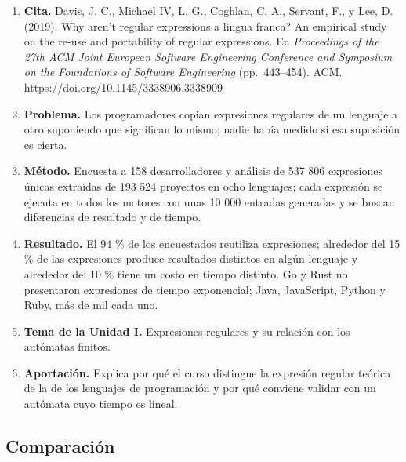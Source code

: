 \begin{enumerate}
\def\labelenumi{\arabic{enumi}.}
\tightlist
\item
  \textbf{Cita.} Davis, J. C., Michael IV, L. G., Coghlan, C. A., Servant, F., y Lee, D. (2019). Why aren't regular expressions a lingua franca? An empirical study on the re-use and portability of regular expressions. En \emph{Proceedings of the 27th ACM Joint European Software Engineering Conference and Symposium on the Foundations of Software Engineering} (pp.~443--454). ACM. \url{https://doi.org/10.1145/3338906.3338909}
\item
  \textbf{Problema.} Los programadores copian expresiones regulares de un lenguaje a otro suponiendo que significan lo mismo; nadie había medido si esa suposición es cierta.
\item
  \textbf{Método.} Encuesta a 158 desarrolladores y análisis de 537 806 expresiones únicas extraídas de 193 524 proyectos en ocho lenguajes; cada expresión se ejecuta en todos los motores con unas 10 000 entradas generadas y se buscan diferencias de resultado y de tiempo.
\item
  \textbf{Resultado.} El 94 \% de los encuestados reutiliza expresiones; alrededor del 15 \% de las expresiones produce resultados distintos en algún lenguaje y alrededor del 10 \% tiene un costo en tiempo distinto. Go y Rust no presentaron expresiones de tiempo exponencial; Java, JavaScript, Python y Ruby, más de mil cada uno.
\item
  \textbf{Tema de la Unidad I.} Expresiones regulares y su relación con los autómatas finitos.
\item
  \textbf{Aportación.} Explica por qué el curso distingue la expresión regular teórica de la de los lenguajes de programación y por qué conviene validar con un autómata cuyo tiempo es lineal.
\end{enumerate}

\hypertarget{comparaciuxf3n}{%
\subsection{Comparación}\label{comparaciuxf3n}}


